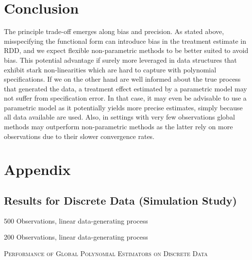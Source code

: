 \documentclass[11pt, a4paper, leqno]{article}
\numberwithin{equation}{section}
\numberwithin{figure}{section}
\numberwithin{table}{section}
\numberwithin{algorithm}{section}
\begin{document}
\section{Conclusion} %
\label{sec: conclusion}



The principle trade-off emerges along bias and precision. As stated above, misspecifying the functional form can introduce bias in the treatment estimate in RDD, and we expect flexible non-parametric methods to be better suited to avoid bias. This potential advantage if surely more leveraged in data structures that exhibit stark non-linearities which are hard to capture with polynomial specifications. If we on the other hand are well informed about the true process that generated the data, a treatment effect estimated by a parametric model may not suffer from specification error. In that case, it may even be advisable to use a parametric model as it potentially yields more precise estimates, simply because all data available are used. Also, in settings with very few observations global methods may outperform non-parametric methods as the latter rely on more observations due to their slower convergence rates.



\clearpage

\clearpage

\setcounter{section}{1}
\renewcommand\thesubsection{\Alph{subsection}}
\renewcommand\thetable{\Alph{section}.\arabic{table}}

\section*{\LARGE Appendix}
\subsection{Results for Discrete Data (Simulation Study)} \label{discrete_data}


\begin{table}[H]
	\begin{subtable}{\textwidth}
		\centering
		
		\caption{500 Observations, linear data-generating process}
		\label{tab: global_poly_500}
		\hspace{\fill}
	\end{subtable}
	\begin{subtable}{\textwidth}
		\centering
		
		\caption{200 Observations, linear data-generating process}
		\label{tab: global_poly_200}
		\hspace{\fill}
	\end{subtable}
	\caption{\textsc{Performance of Global Polynomial Estimators on Discrete Data}}
	\label{tab: perf_para_discr}
\end{table}
\end{document}
